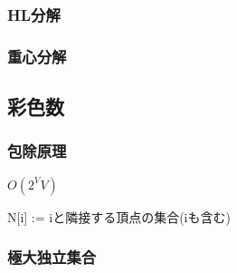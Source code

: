 \subsubsection{HL分解}


\subsubsection{重心分解}

\subsection{彩色数}
\subsubsection{包除原理}
$O(2^VV)$\par
N[i] := iと隣接する頂点の集合(iも含む)\par

\subsubsection{極大独立集合}


